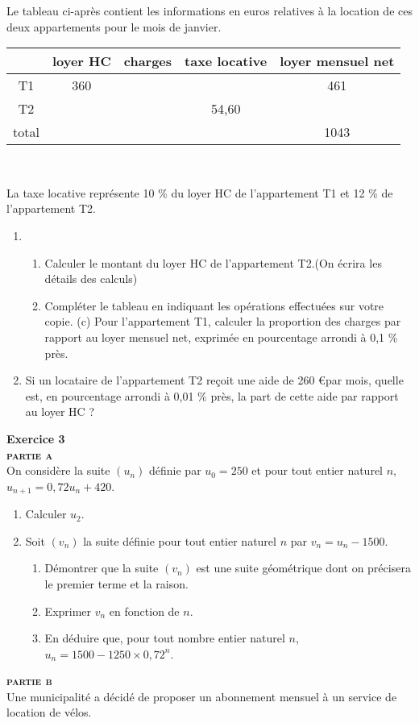 \documentclass[12pt,a4paper]{article}
\renewcommand{\arraystretch}{0.7}
\theoremstyle{break}
\begin{document}
	Le tableau ci-après contient les informations en euros relatives à la location de ces deux appartements pour le mois de janvier.\\
	\begin{center}
	\renewcommand{\arraystretch}{2}
	\begin{tabular}{|c|c|c|c|c|}
		\hline
		&loyer HC& charges& taxe locative &loyer mensuel net\\
		\hline
		T1& 360 &&&461\\ 
		\hline
		T2 &&&54,60&\\
		\hline
		total&&&& 1043\\
		\hline
	\end{tabular}\\
	\end{center}
	La taxe locative représente 10 \% du loyer HC de l’appartement T1 et 12 \% de l’appartement T2.
	\begin{enumerate}
		\item 
		\begin{enumerate}
			\item Calculer le montant du loyer HC de l’appartement T2.(On écrira les détails des calculs)
			\item Compléter le tableau en indiquant les opérations effectuées sur votre copie.
			(c) Pour l’appartement T1, calculer la proportion des charges par rapport au loyer mensuel
			net, exprimée en pourcentage arrondi à 0,1 \% près.
		\end{enumerate}
		\item Si un locataire de l’appartement T2 reçoit une aide de 260 \euro par mois, quelle est, en pourcentage arrondi à 0,01 \% près, la part de cette aide par rapport au loyer HC ?
		
	\end{enumerate}
\newpage
\textbf{Exercice 3}\\
		\textsf{\small{\textsc{\textbf{partie a}}}}\\
		On considère la suite $\left(u_{n}\right)$ définie par $u_{0} = 250$ et pour tout entier naturel $n$, $ u_{n+1} = 0,72u_{n} +420$.
	
	\begin{enumerate}
		\item Calculer $u_2$.
		
		\item Soit $\left(v_{n}\right)$  la suite définie pour tout entier naturel $n$ par $v_{n} = u_{n} - 1500$. 
		\begin{enumerate}
			\item Démontrer que la suite $\left(v_{n}\right)$ est une suite géométrique dont on précisera le premier terme et la raison. 
			\item Exprimer $v_{n}$ en fonction de $n$.
			\item En déduire que, pour tout nombre entier naturel $n$, $u_{n} = 1500 -1250\times  0,72^n$.
		\end{enumerate} 
	
	\end{enumerate}
		\textsf {\textbf{\textsc{partie b}}}\\
	Une municipalité a décidé de proposer un abonnement mensuel à un service de location de vélos.
	
\end{document}
